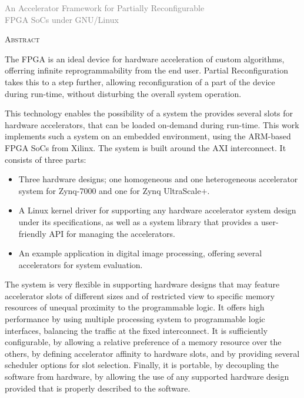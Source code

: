 \cleardoublepage
\rm
\begin{center}
	\textcolor{gray} {\large
		An Accelerator Framework for Partially Reconfigurable\\
		FPGA SoCs under GNU/Linux\\
	}

	\vspace{20pt}
	\textsc{\large Abstract}\\
	\vspace{0pt}
\end{center}
The FPGA is an ideal device for hardware acceleration of custom algorithms,
offerring infinite reprogrammability from the end user. Partial Reconfiguration
takes this to a step further, allowing reconfiguration of a part of the device
during run-time, without disturbing the overall system operation.

This technology enables the possibility of a system the provides several
slots for hardware accelerators, that can be loaded on-demand during run-time.
This work implements such a system on an embedded environment, using
the ARM-based FPGA SoCs from Xilinx. The system is built around the AXI interconnect.
It consists of three parts:

\begin{itemize}
\item	Three hardware designs; one homogeneous and one heterogeneous accelerator system for Zynq-7000
	and one for Zynq UltraScale+.
\item	A Linux kernel driver for supporting any hardware accelerator system design under its specifications,
	as well as a system library that provides a user-friendly API for managing the accelerators.
\item	An example application in digital image processing, offering several accelerators for system evaluation.
\end{itemize}

The system is very flexible in supporting hardware designs that may feature accelerator slots of different sizes
and of restricted view to specific memory resources of unequal proximity to the programmable logic.
It offers high performance by using multiple processing system to programmable logic interfaces, balancing
the traffic at the fixed interconnect. It is sufficiently configurable, by allowing a relative preference
of a memory resource over the others, by defining accelerator affinity to hardware slots,
and by providing several scheduler options for slot selection. Finally, it is portable, by decoupling 
the software from hardware, by allowing the use of any supported hardware design provided that is
properly described to the software.

\vspace*{\fill}

